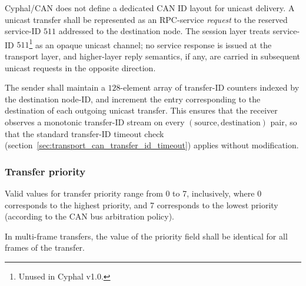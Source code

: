Cyphal/CAN does not define a dedicated CAN ID layout for unicast delivery.
A unicast transfer shall be represented as an RPC-service \emph{request} to the reserved service-ID $511$
addressed to the destination node.
The session layer treats service-ID $511$\footnote{Unused in Cyphal v1.0.} as an opaque unicast channel;
no service response is issued at the transport layer, and higher-layer reply semantics, if any,
are carried in subsequent unicast requests in the opposite direction.

The sender shall maintain a $128$-element array of transfer-ID counters indexed by the destination node-ID,
and increment the entry corresponding to the destination of each outgoing unicast transfer.
This ensures that the receiver observes a monotonic transfer-ID stream on every $(\text{source}, \text{destination})$
pair, so that the standard transfer-ID timeout check
(section~\ref{sec:transport_can_transfer_id_timeout}) applies without modification.

\subsubsection{Transfer priority}

Valid values for transfer priority range from 0 to 7, inclusively,
where 0 corresponds to the highest priority, and 7 corresponds to the lowest priority
(according to the CAN bus arbitration policy).

In multi-frame transfers, the value of the priority field shall be identical for all frames of the transfer.

